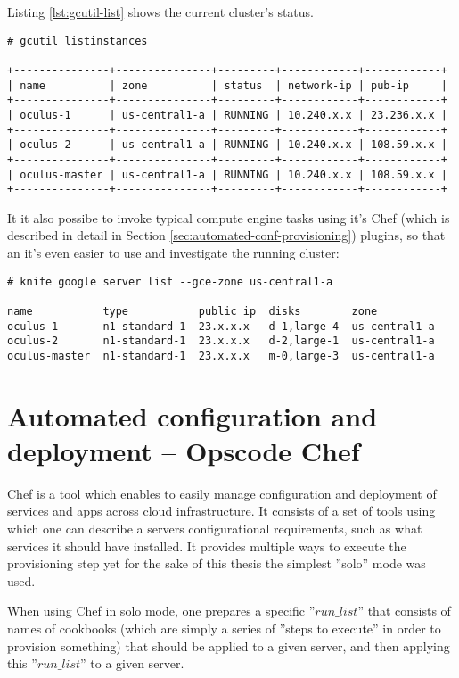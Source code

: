 Listing \ref{lst:gcutil-list} shows the current cluster's status.


\label{lst:gcutil-list}
\begin{verbatim}
# gcutil listinstances

+---------------+---------------+---------+------------+------------+
| name          | zone          | status  | network-ip | pub-ip     |
+---------------+---------------+---------+------------+------------+
| oculus-1      | us-central1-a | RUNNING | 10.240.x.x | 23.236.x.x |
+---------------+---------------+---------+------------+------------+
| oculus-2      | us-central1-a | RUNNING | 10.240.x.x | 108.59.x.x |
+---------------+---------------+---------+------------+------------+
| oculus-master | us-central1-a | RUNNING | 10.240.x.x | 108.59.x.x |
+---------------+---------------+---------+------------+------------+
\end{verbatim}

It it also possibe to invoke typical compute engine tasks using it's Chef (which is described in detail in Section \ref{sec:automated-conf-provisioning}) plugins, so that an it's even easier to use and investigate the running cluster:

\begin{verbatim}
# knife google server list --gce-zone us-central1-a

name           type           public ip  disks        zone           
oculus-1       n1-standard-1  23.x.x.x   d-1,large-4  us-central1-a  
oculus-2       n1-standard-1  23.x.x.x   d-2,large-1  us-central1-a  
oculus-master  n1-standard-1  23.x.x.x   m-0,large-3  us-central1-a  
\end{verbatim}


\label{sec:automated-conf-provisioning}
\section{Automated configuration and deployment -- Opscode Chef}

Chef is a tool which enables to easily manage configuration and deployment of services and apps across cloud infrastructure. It consists of a set of tools using which one can describe a servers configurational requirements, such as what services it should have installed. It provides multiple ways to execute the provisioning step yet for the sake of this thesis the simplest ''solo'' mode was used. 

When using Chef in solo mode, one prepares a specific ''$run\_list$'' that consists of names of cookbooks (which are simply a series of ''steps to execute'' in order to provision something) that should be applied to a given server, and then applying this ''$run\_list$'' to a given server.

